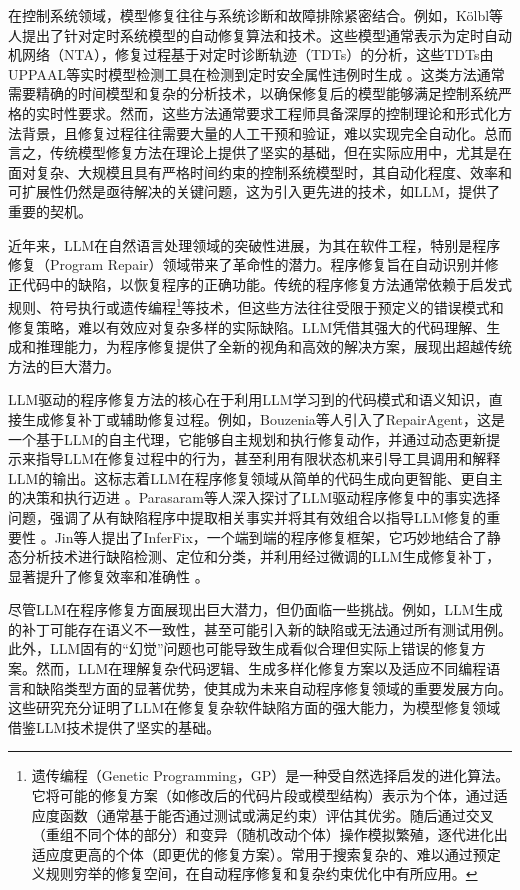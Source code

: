 在控制系统领域，模型修复往往与系统诊断和故障排除紧密结合。例如，Kölbl等人提出了针对定时系统模型的自动修复算法和技术。这些模型通常表示为定时自动机网络（NTA），修复过程基于对定时诊断轨迹（TDTs）的分析，这些TDTs由UPPAAL等实时模型检测工具在检测到定时安全属性违例时生成 。这类方法通常需要精确的时间模型和复杂的分析技术，以确保修复后的模型能够满足控制系统严格的实时性要求。然而，这些方法通常要求工程师具备深厚的控制理论和形式化方法背景，且修复过程往往需要大量的人工干预和验证，难以实现完全自动化。总而言之，传统模型修复方法在理论上提供了坚实的基础，但在实际应用中，尤其是在面对复杂、大规模且具有严格时间约束的控制系统模型时，其自动化程度、效率和可扩展性仍然是亟待解决的关键问题，这为引入更先进的技术，如LLM，提供了重要的契机。

近年来，LLM在自然语言处理领域的突破性进展，为其在软件工程，特别是程序修复（Program Repair）领域带来了革命性的潜力。程序修复旨在自动识别并修正代码中的缺陷，以恢复程序的正确功能。传统的程序修复方法通常依赖于启发式规则、符号执行或遗传编程\footnote{遗传编程（Genetic Programming，GP）是一种受自然选择启发的进化算法。它将可能的修复方案（如修改后的代码片段或模型结构）表示为个体，通过适应度函数（通常基于能否通过测试或满足约束）评估其优劣。随后通过交叉（重组不同个体的部分）和变异（随机改动个体）操作模拟繁殖，逐代进化出适应度更高的个体（即更优的修复方案）。常用于搜索复杂的、难以通过预定义规则穷举的修复空间，在自动程序修复和复杂约束优化中有所应用。}等技术，但这些方法往往受限于预定义的错误模式和修复策略，难以有效应对复杂多样的实际缺陷。LLM凭借其强大的代码理解、生成和推理能力，为程序修复提供了全新的视角和高效的解决方案，展现出超越传统方法的巨大潜力。

LLM驱动的程序修复方法的核心在于利用LLM学习到的代码模式和语义知识，直接生成修复补丁或辅助修复过程。例如，Bouzenia等人引入了RepairAgent，这是一个基于LLM的自主代理，它能够自主规划和执行修复动作，并通过动态更新提示来指导LLM在修复过程中的行为，甚至利用有限状态机来引导工具调用和解释LLM的输出。这标志着LLM在程序修复领域从简单的代码生成向更智能、更自主的决策和执行迈进 。Parasaram等人深入探讨了LLM驱动程序修复中的事实选择问题，强调了从有缺陷程序中提取相关事实并将其有效组合以指导LLM修复的重要性 。Jin等人提出了InferFix，一个端到端的程序修复框架，它巧妙地结合了静态分析技术进行缺陷检测、定位和分类，并利用经过微调的LLM生成修复补丁，显著提升了修复效率和准确性 。

尽管LLM在程序修复方面展现出巨大潜力，但仍面临一些挑战。例如，LLM生成的补丁可能存在语义不一致性，甚至可能引入新的缺陷或无法通过所有测试用例。此外，LLM固有的“幻觉”问题也可能导致生成看似合理但实际上错误的修复方案。然而，LLM在理解复杂代码逻辑、生成多样化修复方案以及适应不同编程语言和缺陷类型方面的显著优势，使其成为未来自动程序修复领域的重要发展方向。这些研究充分证明了LLM在修复复杂软件缺陷方面的强大能力，为模型修复领域借鉴LLM技术提供了坚实的基础。

